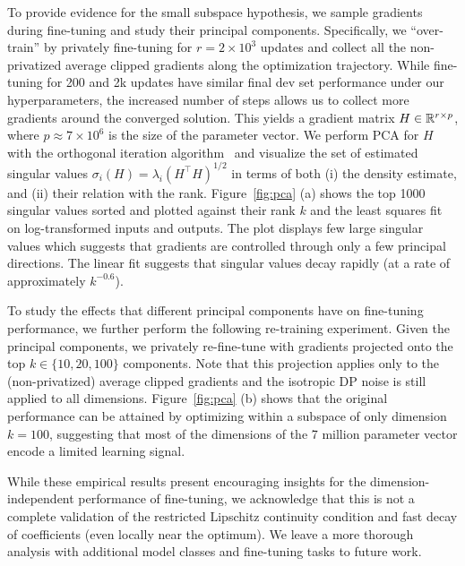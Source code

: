 To provide evidence for the small subspace hypothesis, we sample gradients during fine-tuning and study their principal components.
Specifically, we ``over-train'' by privately fine-tuning for $r = 2 \times 10^3$ updates and collect all the non-privatized average clipped gradients along the optimization trajectory.
While fine-tuning for 200 and 2k updates have similar final dev set performance under our hyperparameters, the increased number of steps allows us to collect more gradients around the converged solution. 
This yields a gradient matrix $H \in \mathbb{R}^{r \times p}$, where $p \approx 7 \times 10^6$ is the size of the parameter vector. 
We perform PCA for $H$ with the orthogonal iteration algorithm~\citep{demmel1997applied} and visualize the set of estimated singular values $\sigma_i(H) = \lambda_i(H^\top H)^{1/2}$ in terms of both (i) the density estimate, and (ii) their relation with the rank.
Figure~\ref{fig:pca} (a) shows the top 1000 singular values sorted and plotted against their rank $k$ and the least squares fit on log-transformed inputs and outputs.
The plot displays few large singular values which suggests that gradients are controlled through only a few principal directions.
The linear fit suggests that singular values decay rapidly (at a rate of approximately $k^{-0.6}$).

To study the effects that different principal components have on fine-tuning performance, we further perform the following re-training experiment. 
Given the principal components, we privately re-fine-tune with gradients projected onto the top $k \in \{10, 20, 100\}$ components.
Note that this projection applies only to the (non-privatized) average clipped gradients and the isotropic DP noise is still applied to all dimensions.
Figure~\ref{fig:pca} (b) shows that the original performance can be attained by optimizing within a subspace of only dimension $k=100$, suggesting that most of the dimensions of the 7 million parameter vector encode a limited learning signal.

While these empirical results present encouraging insights for the dimension-independent performance of fine-tuning, we acknowledge that this is not a complete validation of the restricted Lipschitz continuity condition and fast decay of coefficients (even locally near the optimum).
We leave a more thorough analysis with additional model classes and fine-tuning tasks to future work.

